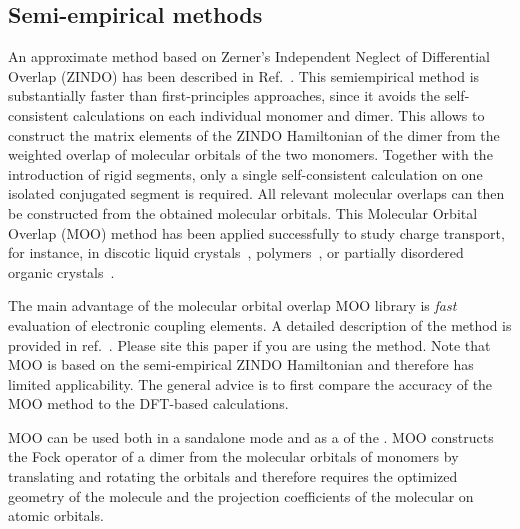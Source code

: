 \subsection{Semi-empirical methods}
\label{sec:moo}

\newcommand{\moo}{MOO\xspace}

An approximate method based on Zerner's Independent Neglect of Differential Overlap (ZINDO) has been described in Ref.~\cite{kirkpatrick_approximate_2008}. This semiempirical method is substantially faster than first-principles approaches, since it avoids the self-consistent calculations on each individual monomer and dimer. This allows to construct the matrix elements of the ZINDO Hamiltonian of the dimer from
the weighted overlap of molecular orbitals of the two monomers. Together with the introduction of rigid segments, only a single self-consistent calculation on one isolated conjugated segment is required. All relevant molecular overlaps can then be constructed from the obtained molecular orbitals. This Molecular Orbital Overlap (MOO) method has been applied successfully to study charge transport, for instance, in discotic liquid crystals~\cite{kirkpatrick_columnar_2008,marcon_understanding_2009,feng_towards_2009},
polymers~\cite{ruehle_multiscale_2010}, or partially disordered organic crystals~\cite{vehoff_charge_2010-1,vehoff_charge_2010-2,vehoff_charge_2010}.

The main advantage of the molecular orbital overlap \moo library is {\em fast} evaluation of electronic coupling elements. A detailed description of the method is provided in ref.~\cite{kirkpatrick_approximate_2008}. Please site this paper if you are using the method. Note that \moo is based on the semi-empirical ZINDO Hamiltonian and therefore has limited applicability. The general advice is to first compare the accuracy of the \moo method to the DFT-based calculations. 

\moo can be used both in a sandalone mode and as a \calculator of the \votcactp. \moo constructs the Fock operator of a dimer from the  molecular orbitals of monomers by translating and rotating the orbitals and therefore requires the optimized geometry of the molecule and the projection coefficients of the molecular on atomic orbitals. 



